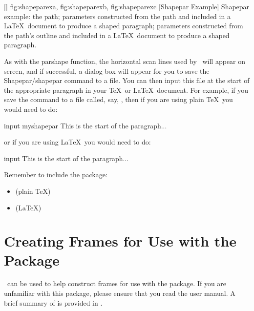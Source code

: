 [\small]
{
  {fig:shapeparexa}{}{},
  {fig:shapeparexb}{}{},
  {fig:shapeparexc}{}{}
}
[Shapepar Example]
{Shapepar example:
 the path;
 parameters constructed from the path and included in a
\LaTeX\ document to produce a shaped paragraph;
parameters constructed from the path's outline and included in a
\LaTeX\ document to produce a shaped paragraph.}

As with the parshape function, the horizontal
scan lines used by \FlowframTk\ will appear on screen, and if
successful, a dialog box will appear for you to save the
\gls{Shapepar}\slash\gls{shapepar} command to a file. You can then input this
file at the start of the appropriate paragraph in your \TeX\ or
\LaTeX\ document. For example, if you save the
command to a file called, say, , then if
you are using plain \TeX\ you would need to do:
\begin{codebox*}
\gls{input} myshapepar
This is the start of the paragraph...
\end{codebox*}
or if you are using \LaTeX\ you would need to do:
\begin{codebox}
\gls{input}\comment{}
This is the start of the paragraph...
\end{codebox}
Remember to include the  package:
\begin{itemize}
\item {} (plain \TeX)
\item {} (\LaTeX)
\end{itemize}



\section{Creating Frames for Use with the  Package}
\label{sec:flowframe}


\FlowframTk\ can be used to help construct frames for use with the
 package. If you are unfamiliar with this
package, please ensure that you read the user manual.
A brief summary of  is provided in .

